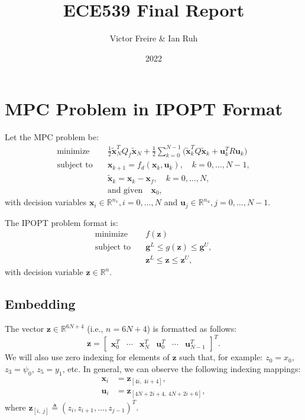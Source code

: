 \documentclass[12pt, letterpaper]{report}
\title{ECE539 Final Report}
\author{Victor Freire \& Ian Ruh}
\date{2022}
\newcommand{\vect}[1]{\boldsymbol{\mathbf{#1}}}
\newcommand{\mat}[1]{\begin{bmatrix} #1 \end{bmatrix}}
\begin{document}
\maketitle

\section*{MPC Problem in IPOPT Format}
Let the MPC problem be:
\begin{align} \label{NMPC} \tag{NMPC}
  \text{minimize} \quad  &\frac{1}{2}
  \tilde{\vect{x}}_N^TQ_f\tilde{\vect{x}}_N + \frac{1}{2}\sum_{k=0}^{N -
  1} \big(\tilde{\vect{x}}_k^T Q \tilde{\vect{x}}_k + \vect{u}_k^T R
  \vect{u}_k\big)\\
  \text{subject to} \quad & \vect{x}_{k+1} = f_d(\vect{x}_k,
  \vect{u}_k), \quad k = 0, \ldots, N-1, \nonumber\\
  &\tilde{\vect{x}}_k = \vect{x}_k - \vect{x}_f, \quad k = 0, \dots,
  N\nonumber,\\
  &\text{and given} \quad \vect{x}_0, \nonumber
\end{align}
with decision variables $\vect{x}_{i}\in \mathbb{R}^{n_x}, i =
0,\ldots,N$ and $\vect{u}_{j}\in\mathbb{R}^{n_u}, j = 0,\ldots,N-1$.

The IPOPT problem format is:
\begin{align} \label{IPOPT} \tag{IPOPT}
  \text{minimize} \quad &f(\vect{z})\\
  \text{subject to} \quad &\vect{g}^L \leq g(\vect{z}) \leq
  \vect{g}^U, \nonumber\\
  &\vect{z}^L \leq \vect{z} \leq \vect{z}^U, \nonumber
\end{align}
with decision variable $\vect{z}\in\mathbb{R}^n$.

\subsection*{Embedding}
The vector $\vect{z} \in \mathbb{R}^{6N+4}$ (i.e., $n=6N+4$) is formatted as follows:
\begin{equation}
  \vect{z} = \mat{\vect{x}_0^T & \cdots & \vect{x}_{N}^T & \vect{u}_0^T
  & \cdots & \vect{u}_{N-1}^T}^T. 
\end{equation}
We will also use zero indexing for elements of $\vect{z}$ such that, for
example: $z_0 = x_0$, $z_3 = \psi_0$, $z_5 = y_1$, etc. In general, we
can observe the following indexing mappings:
\begin{subequations}
\begin{align}
  \vect{x}_i &= \vect{z}_{[4i,\ 4i + 4]},\\
  \vect{u}_i &= \vect{z}_{[4N + 2i + 4,\ 4N + 2i + 6]},
\end{align}
\end{subequations}
where $\vect{z}_{[i,\ j]} \triangleq (z_i, z_{i+1}, \ldots, z_{j-1})^T$.
\end{document}
